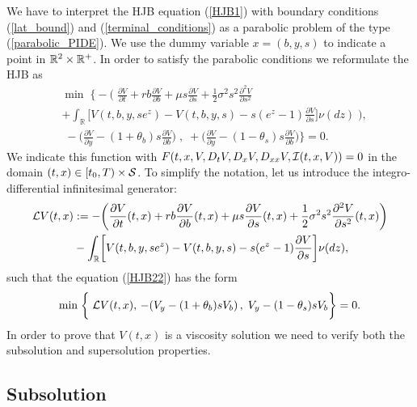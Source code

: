 We have to interpret the HJB equation (\ref{HJB1}) with boundary conditions (\ref{lat_bound}) and (\ref{terminal_conditions}) 
as a parabolic problem of the type (\ref{parabolic_PIDE}). 
We use the dummy variable $x = (b,y,s)$ to indicate a point in $\mathbb{R}^2\times \mathbb{R}^+$. In order to satisfy the parabolic conditions we reformulate the HJB as 
\begin{align}\label{HJB22}
& \min \; \biggl\{ - \biggl( \; \frac{\partial V}{\partial t} + rb\frac{\partial V}{\partial b} 
+ \mu s \frac{\partial V}{\partial s} + \frac{1}{2}\sigma^2 s^2 \frac{\partial^2 V}{\partial s^2} \\ \nonumber
&+ \int_\mathbb{R}
\biggl[ V(t,b,y,se^z) - V(t,b,y,s) - s(e^z-1)\frac{\partial V}{\partial s} \biggr] \nu(dz) \; \biggr) ,\\ \nonumber
& \; - \biggl( \frac{\partial V}{\partial y}-(1+\theta_b) s \frac{\partial V}{\partial b} \biggr) \; 
, \; + \biggl(\frac{\partial V}{\partial y}-(1-\theta_s)s \frac{\partial V}{\partial b} \biggr) \biggr\} = 0. 
\end{align}
We indicate this function with
$ F(t,x,V,D_t V,D_{x} V,D_{xx}V,\mathcal{I}(t,x,V)) = 0$ in the domain $(t,x) \in [t_0,T) \times \mathcal{S}$.
To simplify the notation, let us introduce the integro-differential infinitesimal generator:
\begin{align*}
 \mathcal{L} V(t,x) &:= -\biggl( \frac{\partial V}{\partial t}(t,x) + rb\frac{\partial V}{\partial b}(t,x) 
  + \mu s \frac{\partial V}{\partial s}(t,x) + \frac{1}{2}\sigma^2 s^2 \frac{\partial^2V}{\partial s^2}(t,x)\biggr) \\
  &- \int_{\mathbb{R}}
\biggl[ V(t,b,y,se^z) - V(t,b,y,s) - s(e^z-1)\frac{\partial V}{\partial s} \biggr] \nu(dz),
\end{align*}
such that the equation (\ref{HJB22}) has the form
\begin{equation}\label{qvi_min}
  \min \; \biggl\{ \; \mathcal{L} V(t,x),
  \, -(V_y-(1+\theta_b)sV_b) \, , \; V_y-(1-\theta_s)s V_b \biggr\} = 0.
\end{equation}
In order to prove that $V(t,x)$ is a viscosity solution we need to verify both the subsolution and supersolution properties.



\subsection{Subsolution}

